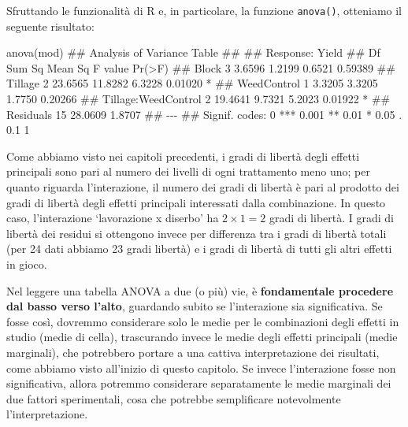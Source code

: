 \documentclass[a4paper,12pt,oneside]{book}
\newenvironment{Shaded}{\begin{snugshade}}{\end{snugshade}}
\newcommand{\DocumentationTok}[1]{#1}
\newcommand{\FunctionTok}[1]{#1}
\newcommand{\NormalTok}[1]{#1}
\begin{document}
Sfruttando le funzionalità di R e, in particolare, la funzione \texttt{anova()}, otteniamo il seguente risultato:

\footnotesize

\begin{Shaded}
\begin{Highlighting}[]
\FunctionTok{anova}\NormalTok{(mod)}
\DocumentationTok{\#\# Analysis of Variance Table}
\DocumentationTok{\#\# }
\DocumentationTok{\#\# Response: Yield}
\DocumentationTok{\#\#                     Df  Sum Sq Mean Sq F value  Pr(\textgreater{}F)  }
\DocumentationTok{\#\# Block                3  3.6596  1.2199  0.6521 0.59389  }
\DocumentationTok{\#\# Tillage              2 23.6565 11.8282  6.3228 0.01020 *}
\DocumentationTok{\#\# WeedControl          1  3.3205  3.3205  1.7750 0.20266  }
\DocumentationTok{\#\# Tillage:WeedControl  2 19.4641  9.7321  5.2023 0.01922 *}
\DocumentationTok{\#\# Residuals           15 28.0609  1.8707                  }
\DocumentationTok{\#\# {-}{-}{-}}
\DocumentationTok{\#\# Signif. codes:  0 \textquotesingle{}***\textquotesingle{} 0.001 \textquotesingle{}**\textquotesingle{} 0.01 \textquotesingle{}*\textquotesingle{} 0.05 \textquotesingle{}.\textquotesingle{} 0.1 \textquotesingle{} \textquotesingle{} 1}
\end{Highlighting}
\end{Shaded}

\normalsize

Come abbiamo visto nei capitoli precedenti, i gradi di libertà degli effetti principali sono pari al numero dei livelli di ogni trattamento meno uno; per quanto riguarda l'interazione, il numero dei gradi di libertà è pari al prodotto dei gradi di libertà degli effetti principali interessati dalla combinazione. In questo caso, l'interazione `lavorazione x diserbo' ha \(2 \times 1 = 2\) gradi di libertà. I gradi di libertà dei residui si ottengono invece per differenza tra i gradi di libertà totali (per 24 dati abbiamo 23 gradi libertà) e i gradi di libertà di tutti gli altri effetti in gioco.

Nel leggere una tabella ANOVA a due (o più) vie, è \textbf{fondamentale procedere dal basso verso l'alto}, guardando subito se l'interazione sia significativa. Se fosse così, dovremmo considerare solo le medie per le combinazioni degli effetti in studio (medie di cella), trascurando invece le medie degli effetti principali (medie marginali), che potrebbero portare a una cattiva interpretazione dei risultati, come abbiamo visto all'inizio di questo capitolo. Se invece l'interazione fosse non significativa, allora potremmo considerare separatamente le medie marginali dei due fattori sperimentali, cosa che potrebbe semplificare notevolmente l'interpretazione.
\end{document}
